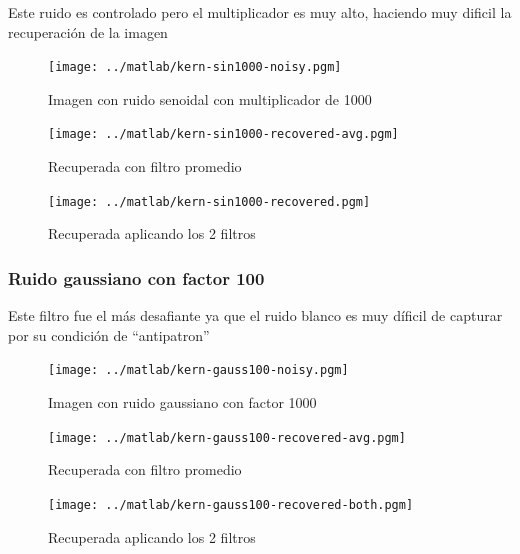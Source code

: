 Este ruido es controlado pero el multiplicador es muy alto, haciendo muy dificil
la recuperaci\'on de la imagen

\begin{figure}
\begin {center}
\texttt{[image: ../matlab/kern-sin1000-noisy.pgm]}
\end {center}
\caption{Imagen con ruido senoidal con multiplicador de 1000}
\label{fig:SinProm}
\end{figure}

\begin{figure}
\begin {center}
\texttt{[image: ../matlab/kern-sin1000-recovered-avg.pgm]}
\end {center}
\caption{Recuperada con filtro promedio}
\label{fig:SinProm}
\end{figure}

\begin{figure}
\begin {center}
\texttt{[image: ../matlab/kern-sin1000-recovered.pgm]}
\end {center}
\caption{Recuperada aplicando los 2 filtros}
\label{fig:SinProm}
\end{figure}


\subsubsection{Ruido gaussiano con factor 100}

Este filtro fue el m\'as desafiante ya que el ruido blanco es muy d\'ificil de
capturar por su condici\'on de ``antipatron''

\begin{figure}
\begin {center}
\texttt{[image: ../matlab/kern-gauss100-noisy.pgm]}
\end {center}
\caption{Imagen con ruido gaussiano con factor 1000}
\label{fig:SinProm}
\end{figure}

\begin{figure}
\begin {center}
\texttt{[image: ../matlab/kern-gauss100-recovered-avg.pgm]}
\end {center}
\caption{Recuperada con filtro promedio}
\label{fig:SinProm}
\end{figure}

\begin{figure}
\begin {center}
\texttt{[image: ../matlab/kern-gauss100-recovered-both.pgm]}
\end {center}
\caption{Recuperada aplicando los 2 filtros}
\label{fig:SinProm}
\end{figure}
